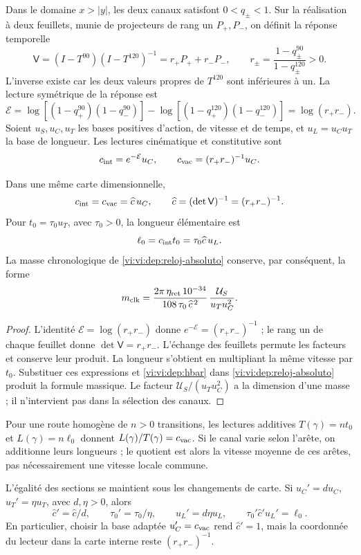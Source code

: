 Dans le domaine \(x>|y|\), les deux canaux satisfont \(0<q_\pm<1\).
Sur la réalisation à deux feuillets, munie de projecteurs de rang un
\(P_+,P_-\), on définit la réponse temporelle
\[
 \mathsf V=(I-T^{90})(I-T^{120})^{-1}
          =r_+P_++r_-P_-,
 \qquad r_\pm=\frac{1-q_\pm^{90}}{1-q_\pm^{120}}>0.
\]
L’inverse existe car les deux valeurs propres de \(T^{120}\) sont inférieures
à un. La lecture symétrique de la réponse est
\[
 \mathcal E=
 \log[(1-q_+^{90})(1-q_-^{90})]
 -\log[(1-q_+^{120})(1-q_-^{120})]
 =\log(r_+r_-).
\]
Soient \(u_S,u_C,u_T\) les bases positives d’action, de vitesse et de
temps, et \(u_L=u_Cu_T\) la base de longueur. Les lectures
cinématique et constitutive sont
\[
 c_{\rm int}=e^{-\mathcal E}u_C,\qquad
 c_{\rm vac}=(r_+r_-)^{-1}u_C.
\]

\begin{proposition}
\label{vi:vi:dep:velocidad-comun}
Dans une même carte dimensionnelle,
\[
 c_{\rm int}=c_{\rm vac}=\widehat c\,u_C,
 \qquad \widehat c=(\det\mathsf V)^{-1}=(r_+r_-)^{-1}.
\]
Pour \(t_0=\tau_0u_T\), avec \(\tau_0>0\), la longueur élémentaire est
\[
 \ell_0=c_{\rm int}t_0=\tau_0\widehat c\,u_L.
\]
La masse chronologique de \eqref{vi:vi:dep:reloj-absoluto} conserve, par
conséquent, la forme
\[
 m_{\rm clk}=
 \frac{2\pi\,\eta_{\rm ret}\,10^{-34}}
      {108\,\tau_0\,\widehat c^{\,2}}\,
 \frac{\mathcal U_S}{u_Tu_C^2}.
\]
\end{proposition}
\begin{proof}
L’identité \(\mathcal E=\log(r_+r_-)\) donne
\(e^{-\mathcal E}=(r_+r_-)^{-1}\) ; le rang un de chaque feuillet donne
\(\det\mathsf V=r_+r_-\). L’échange des feuillets permute les
facteurs et conserve leur produit. La longueur s’obtient en multipliant
la même vitesse par \(t_0\). Substituer ces expressions et
\eqref{vi:vi:dep:hbar} dans \eqref{vi:vi:dep:reloj-absoluto} produit la
formule massique. Le facteur \(\mathcal U_S/(u_Tu_C^2)\) a la
dimension d’une masse ; il n’intervient pas dans la sélection des canaux.
\end{proof}

Pour une route homogène de \(n>0\) transitions, les lectures additives
\(T(\gamma)=nt_0\) et \(L(\gamma)=n\ell_0\) donnent
\(L(\gamma)/T(\gamma)=c_{\rm vac}\). Si le canal varie selon
l’arête, on additionne leurs longueurs ; le quotient est alors la vitesse
moyenne de ces arêtes, pas nécessairement une vitesse locale commune.

L'égalité des sections se maintient sous les changements de carte. Si
\(u_C'=du_C\), \(u_T'=\eta u_T\), avec \(d,\eta>0\), alors
\[
 \widehat c'=\widehat c/d,\qquad
 \tau_0'=\tau_0/\eta,\qquad u_L'=d\eta u_L,
 \qquad
 \tau_0'\widehat c'u_L'=\ell_0.
\]
En particulier, choisir la base adaptée \(u_C'=c_{\rm vac}\)
rend \(\widehat c'=1\), mais la coordonnée du lecteur dans la
carte interne reste \((r_+r_-)^{-1}\).

